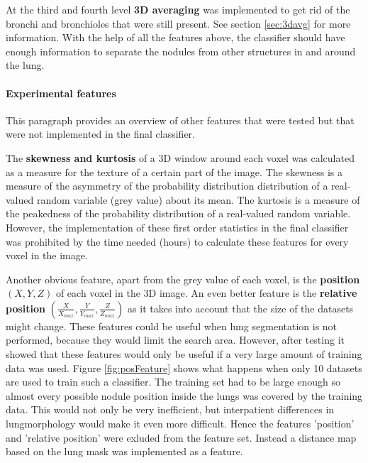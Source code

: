 At the third and fourth level \textbf{3D averaging} was implemented to get rid
of the bronchi and bronchioles that were still present. See section
\ref{sec:3davg} for more information. With the help of all the features above,
the classifier should have enough information to separate the nodules from other
structures in and around the lung.

\paragraph{Experimental features}
This paragraph provides an overview of other features that were
tested but that were not implemented in the final classifier.

The \textbf{skewness and kurtosis} of a 3D window around each
voxel was calculated as a measure for the texture of a certain part of the image. The
skewness is a measure of the asymmetry of the probability distribution
distribution of a real-valued random variable (grey value) about its mean. The
kurtosis is a measure of the peakedness of the probability distribution of a
real-valued random variable. However, the implementation of these first order
statistics in the final classifier was prohibited by the time needed (hours) to
calculate these features for every voxel in the image.

Another obvious feature, apart from the grey value of each voxel, is the
\textbf{position} $(X, Y, Z)$ of each voxel in the 3D image. An even better
feature is the \textbf{relative position} $(\tfrac{X}{X_{max}},
\tfrac{Y}{Y_{max}}, \tfrac{Z}{Z_{max}})$ as it takes into account that the size
of the datasets might change. These features could be useful when lung
segmentation is not performed, because they would limit the search area.
However, after testing it showed that these features would only be useful if a
very large amount of training data was used. Figure \ref{fig:posFeature} shows
what happens when only 10 datasets are used to train such a classifier. The
training set had to be large enough so almost every possible nodule position
inside the lungs was covered by the training data. This would not only be very
inefficient, but interpatient differences in lungmorphology would make it even
more difficult. Hence the features 'position' and 'relative position' were
exluded from the feature set.
Instead a distance map based on the lung mask was implemented as a feature.

